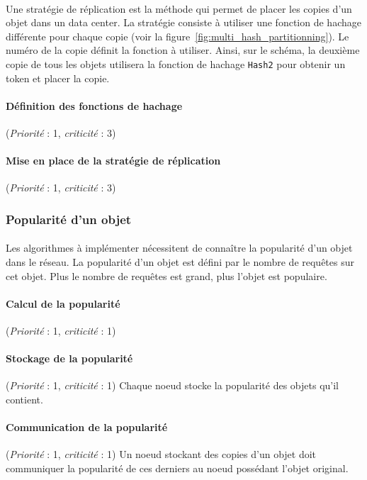 \documentclass[12pt]{article}
\newcommand{\besoin}[2] {
  (\textit{Priorité} : #1, \textit{criticité} : #2)
}
\begin{document}
\paragraph{} Une stratégie de réplication est la méthode qui permet de placer les copies d'un objet dans un data center.
La stratégie consiste à utiliser une fonction de hachage différente pour chaque copie (voir la figure~\ref{fig:multi_hash_partitionning}). 
Le numéro de la copie définit la fonction à utiliser. 
Ainsi, sur le schéma, la deuxième copie de tous les objets utilisera la fonction de hachage \texttt{Hash2} pour obtenir un token et placer la copie.

\paragraph{Définition des fonctions de hachage} \besoin{1}{3}
\paragraph{Mise en place de la stratégie de réplication} \besoin{1}{3}


\subsubsection{Popularité d'un objet}

\paragraph{} Les algorithmes à implémenter nécessitent de connaître la popularité d'un objet dans le réseau.
La popularité d'un objet est défini par le nombre de requêtes sur cet objet.
Plus le nombre de requêtes est grand, plus l'objet est populaire.

\paragraph{Calcul de la popularité} \besoin{1}{1}

\paragraph{Stockage de la popularité} \besoin{1}{1} Chaque noeud stocke la popularité des objets qu'il contient.

\paragraph{Communication de la popularité} \besoin{1}{1} Un noeud stockant des copies d'un objet doit communiquer la popularité de ces derniers au noeud possédant l'objet original.
\end{document}
